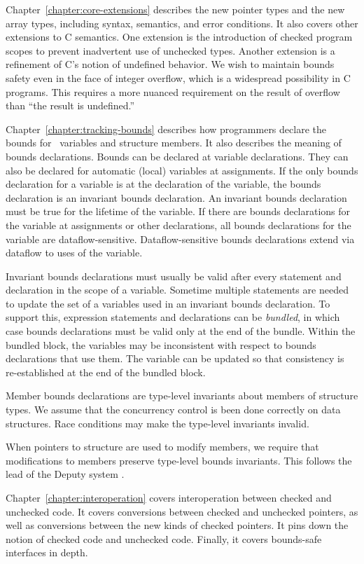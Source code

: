 Chapter~\ref{chapter:core-extensions} describes
the new pointer types and the new array types, including syntax,
semantics, and error conditions. It also covers other extensions to C
semantics. One extension is the introduction of checked program scopes to
prevent inadvertent use of unchecked types. Another extension is a
refinement of C's notion of undefined behavior. We wish to maintain
bounds safety even in the face of integer overflow, which is a
widespread possibility in C programs. This requires a more nuanced
requirement on the result of overflow than ``the result is undefined.''

Chapter~\ref{chapter:tracking-bounds} describes how programmers declare the bounds for
\arrayptr\ variables and structure members. It also describes the meaning of bounds declarations.
Bounds can be declared at variable declarations. They can also be
declared for automatic (local) variables at assignments. If the only
bounds declaration for a variable is at the declaration of the variable,
the bounds declaration is an invariant bounds declaration. An invariant
bounds declaration must be true for the lifetime of the variable. If
there are bounds declarations for the variable at assignments or other
declarations, all bounds declarations for the variable are
dataflow-sensitive. Dataflow-sensitive bounds declarations extend via
dataflow to uses of the variable.

Invariant bounds declarations must usually be valid after every
statement and declaration in the scope of a variable. Sometime multiple
statements are needed to update the set of a variables used in an
invariant bounds declaration. To support this, expression statements and
declarations can be \emph{bundled}, in which case bounds declarations
must be valid only at the end of the bundle. Within the bundled block,
the variables may be inconsistent with respect to bounds declarations
that use them. The variable can be updated so that consistency is
re-established at the end of the bundled block.

Member bounds declarations are type-level invariants about members
of structure types. We assume that the concurrency control is
been done correctly on data structures.  Race conditions may
make the type-level invariants invalid.

When pointers to structure are used to modify members, we require
that modifications to members preserve type-level bounds invariants.
This follows the lead of the Deputy system \cite{Condit2007}.

Chapter~\ref{chapter:interoperation} covers interoperation between
checked and unchecked code. It covers conversions between checked and
unchecked pointers, as well as conversions between the new kinds of checked pointers.
It pins down the notion of checked code  and unchecked code. Finally, it covers
bounds-safe interfaces in depth.

